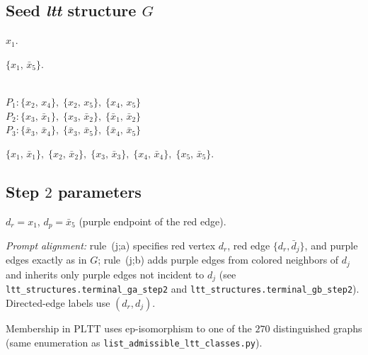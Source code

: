\subsection*{Seed \emph{ltt} structure $G$}
\begin{description}[style=nextline, font=\normalfont\bfseries]
\item[Red vertex] $\displaystyle x_{1}$.
\item[Red edge] $\displaystyle \{x_{1},\,\bar{x}_{5}\}$.
\item[Purple edges ($9$)]\mbox{}\\
$P_{1}: \{x_{2},\,x_{4}\},\; \{x_{2},\,x_{5}\},\; \{x_{4},\,x_{5}\}$\\
$P_{2}: \{x_{3},\,\bar{x}_{1}\},\; \{x_{3},\,\bar{x}_{2}\},\; \{\bar{x}_{1},\,\bar{x}_{2}\}$\\
$P_{3}: \{\bar{x}_{3},\,\bar{x}_{4}\},\; \{\bar{x}_{3},\,\bar{x}_{5}\},\; \{\bar{x}_{4},\,\bar{x}_{5}\}$
\item[Black edges ($5$)] $\displaystyle \{x_{1},\,\bar{x}_{1}\},\; \{x_{2},\,\bar{x}_{2}\},\; \{x_{3},\,\bar{x}_{3}\},\; \{x_{4},\,\bar{x}_{4}\},\; \{x_{5},\,\bar{x}_{5}\}$.
\end{description}

\subsection*{Step $2$ parameters}
$d_r = x_{1}$, $d_p = \bar{x}_{5}$ (purple endpoint of the red edge).\par\smallskip
\noindent\textit{Prompt alignment:} rule~(j;a) specifies red vertex $d_r$, red edge $\{d_r,\bar{d}_j\}$, and purple edges exactly as in $G$; rule~(j;b) adds purple edges from colored neighbors of $d_j$ and inherits only purple edges not incident to $d_j$ (see \texttt{ltt\_structures.terminal\_ga\_step2} and \texttt{ltt\_structures.terminal\_gb\_step2}). Directed-edge labels use $(d_r,d_j)$.

Membership in $\mathrm{PLTT}$ uses ep-isomorphism to one of the $270$ distinguished graphs (same enumeration as \texttt{list\_admissible\_ltt\_classes.py}).\par\smallskip

